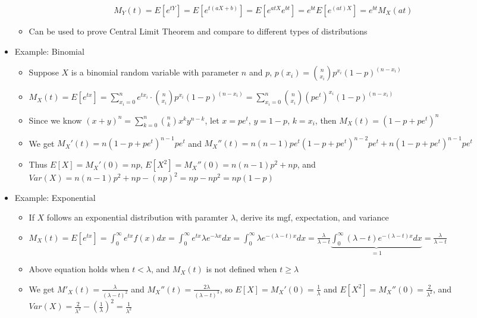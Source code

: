 \documentclass{article}
\begin{document}
\begin{itemize}
    \[
    M_Y(t) = E[e^{tY}] = E[e^{t(aX+b)}] = E[e^{atX}e^{bt}] = e^{bt} E[e^{(at)X}] = e^{bt} M_X(at)
    \]
    \begin{itemize}
        \item Can be used to prove Central Limit Theorem and compare to different types of distributions
    \end{itemize} 
    \item Example: Binomial
    \begin{itemize}
        \item Suppose $X$ is a binomial random variable with parameter $n$ and $p$, $p(x_i) = \binom{n}{x_i} p^{x_i} (1-p)^{(n-x_i)}$
        \item $M_X(t) = E[e^{tx}] = \sum_{x_i=0}^n e^{tx_i} \cdot \binom{n}{x_i}p^{x_i} (1-p)^{(n-x_i)} = \sum_{x_i=0}^n \binom{n}{x_i}(pe^t)^{x_i} (1-p)^{(n-x_i)}$
        \item Since we know $(x+y)^n = \sum_{k=0}^n \binom{n}{k} x^k y^{n-k}$, let $x = pe^t$, $y=1-p$, $k=x_i$, then $M_X(t) = (1-p+pe^t)^n$
        \item We get $M_X'(t) = n(1-p+pe^t)^{n-1}pe^t$ and $M_X''(t) = n(n-1)pe^t(1-p+pe^t)^{n-2}pe^t + n(1-p+pe^t)^{n-1}pe^t$
        \item Thus $E[X] = M_X'(0)=np$, $E[X^2] = M_X''(0)=n(n-1)p^2 + np$, and $Var(X) = n(n-1)p^2 + np - (np)^2 = np - np^2 = np(1-p)$
    \end{itemize}
    \item Example: Exponential
    \begin{itemize}
        \item If $X$ follows an exponential distribution with paramter $\lambda$, derive its mgf, expectation, and variance
        \item $M_X(t)=E[e^{tx}] = \int_0^\infty e^{tx}f(x)dx = \int_0^\infty e^{tx} \lambda e^{-\lambda x} dx = \int_0^\infty \lambda e^{-(\lambda - t)x} dx = \frac{\lambda}{\lambda - t} \underbrace{\int_0^\infty (\lambda - t)e^{-(\lambda - t)x} dx}_{=1} = \frac{\lambda}{\lambda - t}$
        \item Above equation holds when $t < \lambda$, and $M_X(t)$ is not defined when $t \ge \lambda$
        \item We get $M'_X(t) = \frac{\lambda}{(\lambda - t)^2}$ and $M_X''(t) = \frac{2\lambda}{(\lambda - t)^3}$, so $E[X] = M_X'(0) = \frac{1}{\lambda}$ and $E[X^2] = M_X''(0) = \frac{2}{\lambda^2}$, and $Var(X) = \frac{2}{\lambda^2} - (\frac{1}{\lambda})^2 = \frac{1}{\lambda^2}$
    \end{itemize}

\end{itemize}
\end{document}
